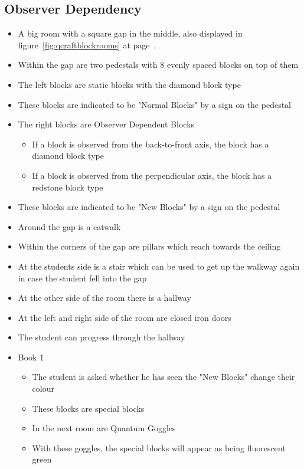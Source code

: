 \documentclass[11pt,twoside]{report} %
\begin{document}
\subsection{Observer Dependency}
\begin{itemize}
	\item A big room with a square gap in the middle, also displayed in figure~\ref{fig:qcraftblockrooms} at page~\pageref{fig:qcraftblockrooms}.
	\item Within the gap are two pedestals with 8 evenly spaced blocks on top of them
	\item The left blocks are static blocks with the diamond block type
	\item These blocks are indicated to be "Normal Blocks" by a sign on the pedestal
	\item The right blocks are Observer Dependent Blocks
	\begin{itemize}
		\item If a block is observed from the back-to-front axis, the block has a diamond block type
		\item If a block is observed from the perpendicular axis, the block has a redstone block type
	\end{itemize}
	\item These blocks are indicated to be "New Blocks" by a sign on the pedestal
	\item Around the gap is a catwalk
	\item Within the corners of the gap are pillars which reach towards the ceiling
	\item At the students side is a stair which can be used to get up the walkway again in case the student fell into the gap
	\item At the other side of the room there is a hallway
	\item At the left and right side of the room are closed iron doors
	\item The student can progress through the hallway
	\item Book 1
	\begin{itemize}
		\item The student is asked whether he has seen the "New Blocks" change their colour
		\item These blocks are special blocks
		\item In the next room are Quantum Goggles
		\item With these goggles, the special blocks will appear as being fluorescent green
	\end{itemize}

\end{itemize}
\end{document}
